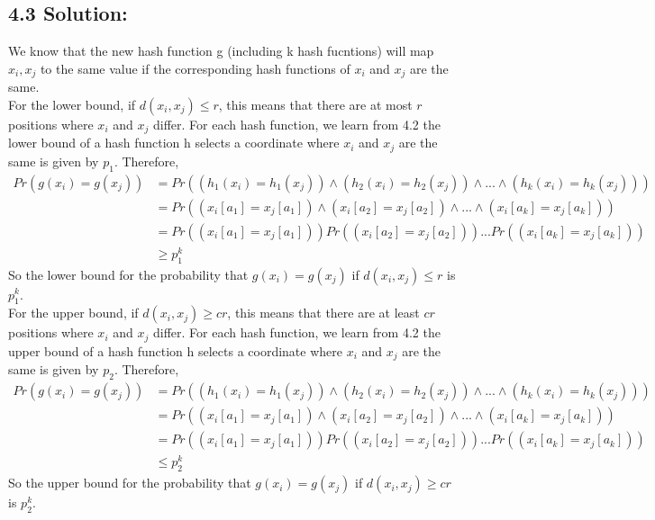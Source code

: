 \documentclass{article}
\begin{document}
\subsection*{4.3 Solution:}
We know that the new hash function g (including k hash fucntions) will map $x_i, x_j$ to the same value if the corresponding hash functions of $x_i$ and $x_j$ are the same. \\
For the lower bound, if \( d(x_i, x_j) \leq r \), this means that there are at most $r$ positions where \(x_i\) and \(x_j\) differ. For each hash function, we learn from 4.2 the lower bound of a hash function h selects a coordinate where \( x_i \) and \( x_j \) are the same is given by $p_1$. Therefore, 
\begin{align*}
    Pr(g(x_i) = g(x_j)) &= Pr((h_1(x_i) = h_1(x_j)) \land (h_2(x_i) = h_2(x_j)) \land ... \land (h_k(x_i) = h_k(x_j)))\\
                        &= Pr((x_i[a_1] = x_j[a_1]) \land (x_i[a_2] = x_j[a_2]) \land ... \land (x_i[a_k] = x_j[a_k]))\\
                        &= Pr((x_i[a_1] = x_j[a_1]))Pr((x_i[a_2] = x_j[a_2]))...Pr((x_i[a_k] = x_j[a_k]))\\
                        &\geq p_1^k
\end{align*} So the lower bound for the probability that $g(x_i) = g(x_j)$ if \( d(x_i, x_j) \leq r \) is $p_1^k$.\\
For the upper bound, if \( d(x_i, x_j) \geq c r \), this means that there are at least $c r$ positions where \(x_i\) and \(x_j\) differ. For each hash function, we learn from 4.2 the upper bound of a hash function h selects a coordinate where \( x_i \) and \( x_j \) are the same is given by $p_2$. Therefore, 
\begin{align*}
    Pr(g(x_i) = g(x_j)) &= Pr((h_1(x_i) = h_1(x_j)) \land (h_2(x_i) = h_2(x_j)) \land ... \land (h_k(x_i) = h_k(x_j)))\\
                        &= Pr((x_i[a_1] = x_j[a_1]) \land (x_i[a_2] = x_j[a_2]) \land ... \land (x_i[a_k] = x_j[a_k]))\\
                        &= Pr((x_i[a_1] = x_j[a_1]))Pr((x_i[a_2] = x_j[a_2]))...Pr((x_i[a_k] = x_j[a_k]))\\
                        &\leq p_2^k
\end{align*} So the upper bound for the probability that $g(x_i) = g(x_j)$ if \( d(x_i, x_j) \geq c r \) is $p_2^k$.
\end{document}
